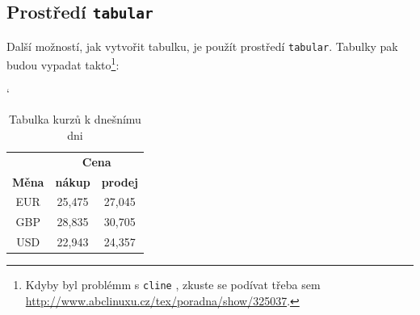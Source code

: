 \documentclass[11pt, ]{article}
\begin{document}
\subsection{Prostředí \texttt{tabular}}

Další možností, jak vytvořit tabulku, je použít prostředí \verb!tabular!. Tabulky pak 
budou vypadat takto\footnote{Kdyby byl problémm s \texttt{cline} , zkuste se podívat třeba sem  \url{http://www.abclinuxu.cz/tex/poradna/show/325037}.\vfill{}}:

\begin{table}[h]
\catcode`
    \centering
    \begin{tabular}{|c|c|c|}
    \hline
                    & \multicolumn{2}{c|}{\textbf{Cena}}    \\\cline{2-3}
    \textbf{Měna}   & \textbf{nákup}    & \textbf{prodej}   \\\hline
    EUR             & 25,475            & 27,045            \\
    GBP             & 28,835            & 30,705            \\
    USD             & 22,943            & 24,357            \\
    
    \hline
    \end{tabular}
    \caption{Tabulka kurzů k dnešnímu dni}
    \label{tab:1}
\end{table}
\end{document}
